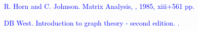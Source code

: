 \documentclass[amsthm]{elsart}
\begin{document}
\begin{thebibliography}{99}
\textcolor{blue}{
R. Horn and C. Johnson.
\newblock Matrix Analysis,
, 1985, xiii+561 pp.}

\textcolor{blue}{
DB West.
\newblock Introduction to graph theory - second edition.
.}










\end{thebibliography}
\end{document}
